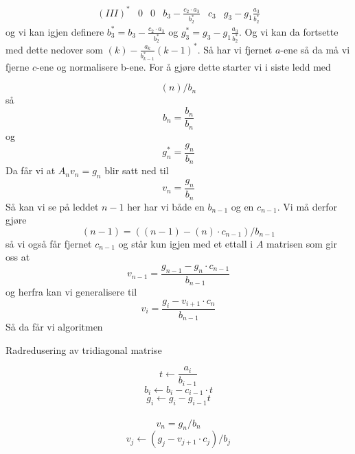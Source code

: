 \documentclass[english,notitlepage]{revtex4-1}  %
\begin{document}
$$ 
\begin{matrix}
(III)^* & 0 &0& b_3-\frac{c_2\cdot a_3}{b_2^*}&c_3 & g_3-g_1\frac{a_3}{b_2^*}
\end{matrix}
$$
og vi kan igjen definere $b_3^*=b_3-\frac{c_2\cdot a_3}{b_2^*}$ og $g_3^*=g_3-g_1\frac{a_3}{b_2^*}$. Og vi kan da fortsette med dette nedover som $(k)-\frac{a_{k}}{b_{k-1}^*}(k-1)^*$. Så har vi fjernet $a$-ene så da må vi fjerne $c$-ene og normalisere b-ene. For å gjøre dette starter vi i siste ledd med

$$
(n)/b_n
$$
så
$$
b_n=\frac{b_n}{b_n}
$$
og
$$
g_n^*=\frac{g_n}{b_n}
$$
Da får vi at
$
A_n v_n=g_n
$
blir satt ned til
$$
v_n=\frac{g_n}{b_n}
$$
Så kan vi se på leddet $n-1$ her har vi både en $b_{n-1}$ og en $c_{n-1}$. Vi må derfor gjøre $$(n-1)=((n-1)-(n)\cdot c_{n-1})/b_{n-1}$$ så vi også får fjernet $c_{n-1}$ og står kun igjen med et ettall i $A$ matrisen som gir oss at 
$$
v_{n-1}=\frac{g_{n-1}-g_n\cdot c_{n-1}}{b_{n-1}}
$$
og herfra kan vi generalisere til
$$
v_{i}=\frac{g_{i}-v_{i+1}\cdot c_{n}}{b_{n-1}}
$$
Så da får vi algoritmen
\begin{algorithm}[H]
	\caption{Radredusering av tridiagonal matrise}\label{algo:midpoint_rule}
	\begin{algorithmic}
		 
		\State $$t\leftarrow \frac{a_i}{b_{i-1}}$$ 
		$$
		b_{i}\leftarrow b_{i}-c_{i-1}\cdot t
		$$ 
		$$
		g_i\leftarrow g_i-g_{i-1} t
		$$  \\
		\EndFor
		\State $$
		v_n=g_n/b_n
		$$ 
		 
		\State
		$$
		v_j\leftarrow (g_j-v_{j+1}\cdot c_j)/b_j
		$$  \\
		\EndFor
	\end{algorithmic}
\end{algorithm}
\end{document}
